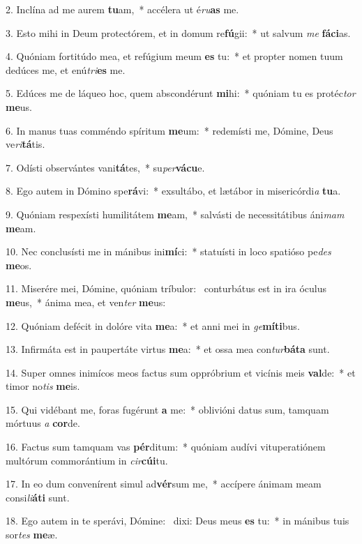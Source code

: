 2. Inclína ad me aurem \textbf{tu}am,~*  accélera ut é\textit{ru}\textbf{as} me.\

3. Esto mihi in Deum protectórem, et in domum re\textbf{fú}gii:~*  ut salvum \textit{me} \textbf{fá}\textbf{ci}as.\

4. Quóniam fortitúdo mea, et refúgium meum \textbf{es} tu:~*  et propter nomen tuum dedúces me, et enú\textit{tri}\textbf{es} me.\

5. Edúces me de láqueo hoc, quem abscondérunt \textbf{mi}hi:~*  quóniam tu es protéc\textit{tor} \textbf{me}us.\

6. In manus tuas comméndo spíritum \textbf{me}um:~*  redemísti me, Dómine, Deus ve\textit{ri}\textbf{tá}tis.\

7. Odísti observántes vani\textbf{tá}tes,~*  su\textit{per}\textbf{vá}\textbf{cu}e.\

8. Ego autem in Dómino spe\textbf{rá}vi:~*  exsultábo, et lætábor in misericórdi\textit{a} \textbf{tu}a.\

9. Quóniam respexísti humilitátem \textbf{me}am,~*  salvásti de necessitátibus áni\textit{mam} \textbf{me}am.\

10. Nec conclusísti me in mánibus ini\textbf{mí}ci:~*  statuísti in loco spatióso pe\textit{des} \textbf{me}os.\

11. Miserére mei, Dómine, quóniam tríbulor: \dag\  conturbátus est in ira óculus \textbf{me}us,~*  ánima mea, et ven\textit{ter} \textbf{me}us:\

12. Quóniam defécit in dolóre vita \textbf{me}a:~*  et anni mei in \textit{ge}\textbf{mí}\textbf{ti}bus.\

13. Infirmáta est in paupertáte virtus \textbf{me}a:~*  et ossa mea con\textit{tur}\textbf{bá}\textbf{ta} sunt.\

14. Super omnes inimícos meos factus sum oppróbrium et vicínis meis \textbf{val}de:~*  et timor no\textit{tis} \textbf{me}is.\

15. Qui vidébant me, foras fugérunt \textbf{a} me:~*  oblivióni datus sum, tamquam mórtuus \textit{a} \textbf{cor}de.\

16. Factus sum tamquam vas \textbf{pér}ditum:~*  quóniam audívi vituperatiónem multórum commorántium in \textit{cir}\textbf{cú}\textbf{i}tu.\

17. In eo dum convenírent simul ad\textbf{vér}sum me,~*  accípere ánimam meam consi\textit{li}\textbf{á}\textbf{ti} sunt.\

18. Ego autem in te sperávi, Dómine: \dag\  dixi: Deus meus \textbf{es} tu:~*  in mánibus tuis sor\textit{tes} \textbf{me}æ.\

